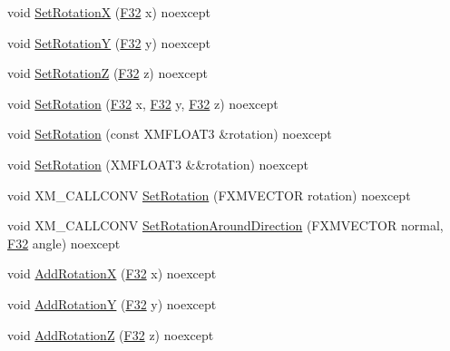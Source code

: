 \begin{DoxyCompactItemize}
\item 
void \hyperlink{structmage_1_1_transform_node_a28fca8112e0e48ba6c6a630c4429b377}{Set\+RotationX} (\hyperlink{namespacemage_aa97e833b45f06d60a0a9c4fc22ae02c0}{F32} x) noexcept
\item 
void \hyperlink{structmage_1_1_transform_node_a131c7b47c7ee2268c49a7fbad26c2405}{Set\+RotationY} (\hyperlink{namespacemage_aa97e833b45f06d60a0a9c4fc22ae02c0}{F32} y) noexcept
\item 
void \hyperlink{structmage_1_1_transform_node_aaa6413a6afa54e1935efd8137ebe4d42}{Set\+RotationZ} (\hyperlink{namespacemage_aa97e833b45f06d60a0a9c4fc22ae02c0}{F32} z) noexcept
\item 
void \hyperlink{structmage_1_1_transform_node_ac87418dfcbc516056657a5ebe8d02ed6}{Set\+Rotation} (\hyperlink{namespacemage_aa97e833b45f06d60a0a9c4fc22ae02c0}{F32} x, \hyperlink{namespacemage_aa97e833b45f06d60a0a9c4fc22ae02c0}{F32} y, \hyperlink{namespacemage_aa97e833b45f06d60a0a9c4fc22ae02c0}{F32} z) noexcept
\item 
void \hyperlink{structmage_1_1_transform_node_a602e7426e81f712a2c5dfcb29e69457b}{Set\+Rotation} (const X\+M\+F\+L\+O\+A\+T3 \&rotation) noexcept
\item 
void \hyperlink{structmage_1_1_transform_node_aceda2ef578b04428dd7a271943daa8c8}{Set\+Rotation} (X\+M\+F\+L\+O\+A\+T3 \&\&rotation) noexcept
\item 
void X\+M\+\_\+\+C\+A\+L\+L\+C\+O\+NV \hyperlink{structmage_1_1_transform_node_a354d20ffedec33173a598718677f7a74}{Set\+Rotation} (F\+X\+M\+V\+E\+C\+T\+OR rotation) noexcept
\item 
void X\+M\+\_\+\+C\+A\+L\+L\+C\+O\+NV \hyperlink{structmage_1_1_transform_node_a05740ca63e180ff694baa549b70ad67c}{Set\+Rotation\+Around\+Direction} (F\+X\+M\+V\+E\+C\+T\+OR normal, \hyperlink{namespacemage_aa97e833b45f06d60a0a9c4fc22ae02c0}{F32} angle) noexcept
\item 
void \hyperlink{structmage_1_1_transform_node_a7428a3f49cb24a9f2eadb94d77e7b87f}{Add\+RotationX} (\hyperlink{namespacemage_aa97e833b45f06d60a0a9c4fc22ae02c0}{F32} x) noexcept
\item 
void \hyperlink{structmage_1_1_transform_node_a609c4d2cfb34f43f365851ab7092fbe1}{Add\+RotationY} (\hyperlink{namespacemage_aa97e833b45f06d60a0a9c4fc22ae02c0}{F32} y) noexcept
\item 
void \hyperlink{structmage_1_1_transform_node_acb9abe975906ff1df858933de4d7cdbc}{Add\+RotationZ} (\hyperlink{namespacemage_aa97e833b45f06d60a0a9c4fc22ae02c0}{F32} z) noexcept
\item 

\end{DoxyCompactItemize}
